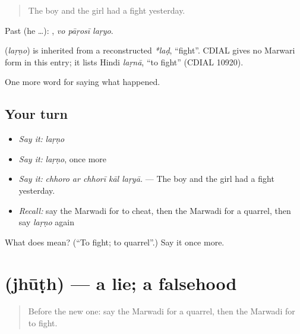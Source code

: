 \begin{quote}
The boy and the girl had a fight yesterday.
\end{quote}

Past (he …):   , \emph{vo pāṛosī laṛyo}.

\begin{cousinweb}
\textbf{} (\emph{laṛṇo}) is inherited from a reconstructed \emph{*laḍ}, \textquotedblleft{}fight\textquotedblright{}. CDIAL gives no Marwari form in this entry; it lists Hindi \emph{laṛnā}, \textquotedblleft{}to fight\textquotedblright{} (CDIAL 10920).
\end{cousinweb}

\begin{grammarlens}[title={What you've built}]
One more word for saying what happened.
\end{grammarlens}

\subsection*{Your turn}
\begin{itemize}
\raggedright
  \item \emph{Say it:} \emph{laṛṇo}
  \item \emph{Say it:} \emph{laṛṇo}, once more
  \item \emph{Say it:} \emph{chhoro ar chhorī kāl laṛyā.} — The boy and the girl had a fight yesterday.
  \item \emph{Recall:} say the Marwadi for to cheat, then the Marwadi for a quarrel, then say \emph{laṛṇo} again
\end{itemize}

\begin{tcolorbox}[breakable,colback=teal!4,colframe=teal!35!black,title={Before you move on}]
What does  mean? (\textquotedblleft{}To fight; to quarrel\textquotedblright{}.) Say it once more.
\end{tcolorbox}
\section[\texorpdfstring{\mw{झूठ} (jhūṭh)}{झूठ (jhūṭh)}]{ (jhūṭh) — a lie; a falsehood}

\label{lesson:MW-C244-jhuth}



\begin{quote}
Before the new one: say the Marwadi for a quarrel, then the Marwadi for to fight.
\end{quote}

